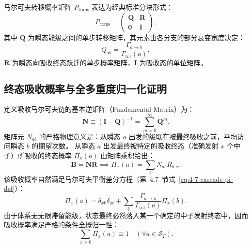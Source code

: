 马尔可夫转移概率矩阵 $P_{\mathrm{trans}}$ 表达为经典标准分块形式：
\begin{equation}\label{eq:appD-markov-transition-matrix}
P_{\mathrm{trans}} = \begin{pmatrix} \mathbf{Q} & \mathbf{R} \\ \mathbf{0} & \mathbf{I} \end{pmatrix},
\end{equation}
其中 $\mathbf{Q}$ 为瞬态能级之间的单步转移矩阵，其元素由各分支的部分衰变宽度决定：
\begin{equation}\label{eq:appD-q-matrix-element}
Q_{ab} = \frac{\Gamma_{a \to b}}{\Gamma_{\mathrm{tot}}(a)},
\end{equation}
$\mathbf{R}$ 为瞬态向吸收终态跃迁的单步概率矩阵，$\mathbf{I}$ 为吸收态的单位矩阵。

\subsection{终态吸收概率与全多重度归一化证明}

定义吸收马尔可夫链的基本逆矩阵（Fundamental Matrix）为：
\begin{equation}\label{eq:appD-fundamental-matrix}
\mathbf{N} \equiv (\mathbf{I} - \mathbf{Q})^{-1} = \sum_{m=0}^\infty \mathbf{Q}^m.
\end{equation}
矩阵元 $N_{ab}$ 的严格物理意义是：从瞬态 $a$ 出发的级联在被最终吸收之前，平均访问瞬态 $b$ 的期望次数。
从瞬态 $a$ 出发最终被特定的吸收终态（准确发射 $x$ 个中子）所吸收的终态概率 $\Pi_x(a)$ 由矩阵乘积给出：
\begin{equation}\label{eq:appD-absorption-prob-matrix}
\mathbf{B} = \mathbf{N} \mathbf{R} \implies \Pi_x(a) = \sum_b N_{ab} R_{b, x}.
\end{equation}
该吸收概率自然满足马尔可夫平衡差分方程（第~4.7~节式~\eqref{eq:4-7-cascade-pi-def}）：
\begin{equation}\label{eq:appD-pi-balance}
\Pi_x(a) = \delta_{x0} \delta_{at} + \sum_b \frac{\Gamma_{a \to b}}{\Gamma_{\mathrm{tot}}(a)} \Pi_x(b).
\end{equation}
由于体系无无限滞留能级，状态最终必然落入某一个确定的中子发射终态中，因而吸收概率满足严格的条件全概归一性：
\begin{equation}\label{eq:appD-pi-sum-unity}
\sum_{x \ge 0} \Pi_x(a) \equiv 1 \quad (\forall a \in \mathcal{S}_T).
\end{equation}

